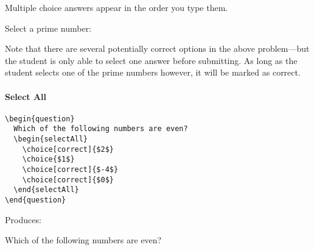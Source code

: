\documentclass{ximera}
\begin{document}
\begin{remark}
  Multiple choice answers appear in the order you type them.
\end{remark}



\begin{problem}
Select a prime number:
\begin{multipleChoice}
\end{multipleChoice}
\end{problem}

Note that there are several potentially correct options in the above
problem---but the student is only able to select one answer before submitting.
As long as the student selects one of the prime numbers however, it will be
marked as correct.

\paragraph{Select All}

\begin{verbatim}
\begin{question}
  Which of the following numbers are even?
  \begin{selectAll}
    \choice[correct]{$2$}
    \choice{$1$}
    \choice[correct]{$-4$}
    \choice[correct]{$0$}
  \end{selectAll}
\end{question}
\end{verbatim}

Produces:

\begin{question}
  Which of the following numbers are even?
  \begin{selectAll}
  \end{selectAll}
\end{question}
\end{document}

